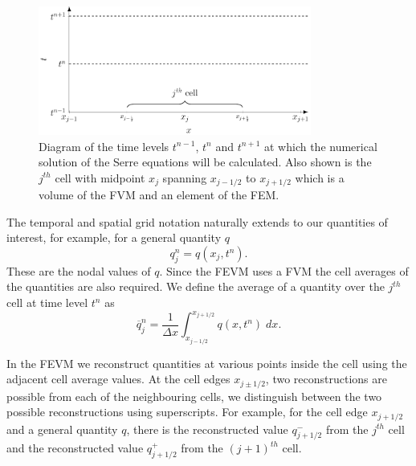 \begin{figure}
	\centering
	\includegraphics[width=0.8\textwidth]{./chp3/figures/Discretisation.pdf}
	\caption{Diagram of the time levels $t^{n-1}$, $t^n$ and $t^{n+1}$ at which the numerical solution of the Serre equations will be calculated. Also shown is the $j^{th}$ cell with midpoint $x_{j}$ spanning $x_{j-1/2}$ to $x_{j+1/2}$ which is a volume of the FVM and an element of the FEM.}
	\label{fig:NumericalGrid}
\end{figure}

The temporal and spatial grid notation naturally extends to our quantities of interest, for example, for a general quantity $q$
\begin{equation*}
q^n_j = q(x_j ,t^n). 
\end{equation*}
These are the nodal values of $q$. Since the FEVM uses a FVM the cell averages of the quantities are also required. We define the average of a quantity over the $j^{th}$ cell at time level $t^n$ as
\begin{equation*}
\overline{q}_j^n = \frac{1}{\Delta x} \int_{x_{j-1/2}}^{x_{j+1/2}} q(x,t^n) \; dx.
\end{equation*}

In the FEVM we reconstruct quantities at various points inside the cell using the adjacent cell average values. At the cell edges $x_{j\pm1/2}$, two reconstructions are possible from each of the neighbouring cells, we distinguish between the two possible reconstructions using superscripts. For example, for the cell edge $x_{j+1/2}$ and a general quantity $q$, there is the reconstructed value $q^-_{j+1/2}$ from the $j^{th}$ cell and the reconstructed value $q^+_{j+1/2}$ from the $(j+1)^{th}$ cell.

